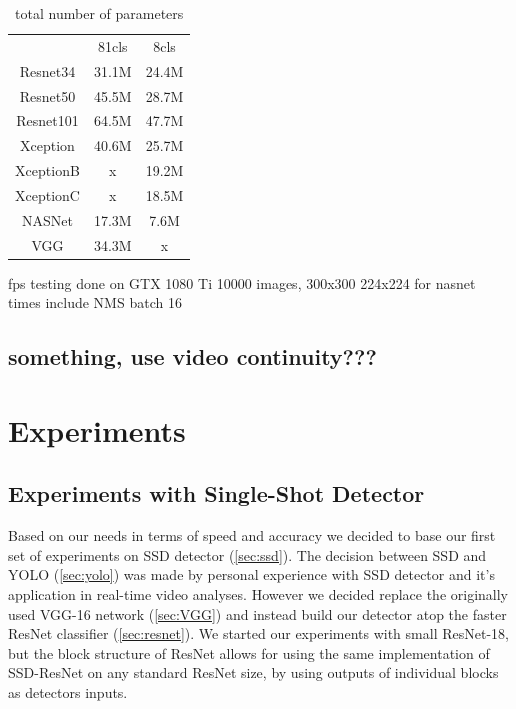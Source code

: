 \begin{table}
    \begin{tabular}{c|c|c}
                    & 81cls     & 8cls  \\
    Resnet34        & 31.1M     & 24.4M \\
    Resnet50        & 45.5M     & 28.7M \\
    Resnet101       & 64.5M     & 47.7M \\
    Xception        & 40.6M     & 25.7M \\
    XceptionB       & x         & 19.2M \\
    XceptionC       & x         & 18.5M \\
    NASNet          & 17.3M     & 7.6M  \\
    VGG             & 34.3M     & x \\
    \end{tabular}
    \caption{total number of parameters}
    \label{tab:parameters}
\end{table}

fps
testing done on GTX 1080 Ti
10000 images, 300x300 
224x224 for nasnet
times include NMS
batch 16


\section{something, use video continuity???}





\chapter*{Experiments}
\section{Experiments with Single-Shot Detector}
\label{chapt:experiments}
Based on our needs in terms of speed and accuracy we decided to base our first set of experiments on SSD detector (\cref{sec:ssd}). The decision between SSD and YOLO (\cref{sec:yolo}) was made by personal experience with SSD detector and it's application in real-time video analyses. However we decided replace the originally used VGG-16 network (\cref{sec:VGG}) and instead build our detector atop the faster ResNet classifier (\cref{sec:resnet}). We started our experiments with small ResNet-18, but the block structure of ResNet allows for using the same implementation of SSD-ResNet on any standard ResNet size, by using outputs of individual blocks as detectors inputs.

